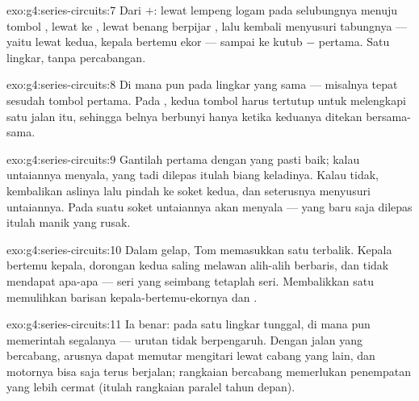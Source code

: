 \begin{solution}{exo:g4:series-circuits:7}
Dari $+$: lewat lempeng logam pada selubungnya menuju tombol
, lewat  ke , lewat benang berpijar
, lalu kembali menyusuri tabungnya --- yaitu lewat 
kedua, kepala bertemu ekor --- sampai ke kutub $-$  pertama.
Satu lingkar, tanpa percabangan.
\end{solution}

\begin{solution}{exo:g4:series-circuits:8}
Di mana pun pada lingkar yang sama --- misalnya tepat sesudah tombol
pertama. Pada , kedua tombol harus tertutup untuk
melengkapi satu jalan itu, sehingga belnya berbunyi hanya ketika
keduanya ditekan bersama-sama.
\end{solution}

\begin{solution}{exo:g4:series-circuits:9}
Gantilah  pertama dengan  yang pasti baik; kalau
untaiannya menyala,  yang tadi dilepas itulah biang keladinya.
Kalau tidak, kembalikan  aslinya lalu pindah ke soket kedua, dan
seterusnya menyusuri untaiannya. Pada suatu soket untaiannya akan
menyala ---  yang baru saja dilepas itulah manik yang rusak.
\end{solution}

\begin{solution}{exo:g4:series-circuits:10}
Dalam gelap, Tom memasukkan satu  terbalik. Kepala bertemu
kepala, dorongan kedua  saling melawan alih-alih berbaris,
dan  tidak mendapat apa-apa --- seri yang seimbang tetaplah
seri. Membalikkan satu  memulihkan barisan
kepala-bertemu-ekornya dan .
\end{solution}

\begin{solution}{exo:g4:series-circuits:11}
Ia benar: pada satu lingkar tunggal,  di mana pun memerintah
segalanya --- urutan tidak berpengaruh. Dengan jalan yang bercabang,
arusnya dapat memutar mengitari  lewat cabang yang lain, dan
motornya bisa saja terus berjalan; rangkaian bercabang memerlukan
penempatan  yang lebih cermat (itulah rangkaian paralel tahun
depan).
\end{solution}
